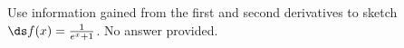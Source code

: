 {Use information gained from the first and second derivatives to sketch $\ds f(x) = \frac{1}{e^x+1}$.
}
{No answer provided.
}

